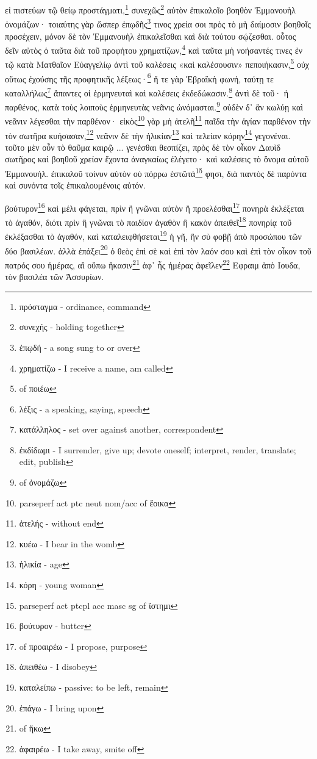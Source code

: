 εἰ
πιστεύων
τῷ
θείῳ
προστάγματι,\footnote{πρόσταγμα - ordinance, command}
συνεχῶς\footnote{συνεχής - holding together}
αὐτὸν
ἐπικαλοῖο
βοηθὸν
Ἐμμανουὴλ
ὀνομάζων·
τοιαύτης
γὰρ
ὥσπερ
ἐπῳδῆς\footnote{ἐπῳδή - a song sung to or over}
τινος
χρεία
σοι
πρὸς
τὸ
μὴ
δαίμοσιν
βοηθοῖς
προσέχειν,
μόνον
δὲ
τὸν
Ἐμμανουὴλ
ἐπικαλεῖσθαι
καὶ
διὰ
τούτου
σῴζεσθαι.
οὗτος
δεῖν
αὐτὸς
ὁ
ταῦτα
διὰ
τοῦ
προφήτου
χρηματίζων,\footnote{χρηματίζω - I receive a name, am called}
καὶ
ταῦτα
μὴ
νοήσαντές
τινες
ἐν
τῷ
κατὰ
Ματθαῖον
Εὐαγγελίῳ
ἀντὶ
τοῦ
καλέσεις
«καὶ
καλέσουσιν»
πεποιήκασιν,\footnote{ of ποιέω}
οὐχ
οὕτως
ἐχούσης
τῆς
προφητικῆς
λέξεως·\footnote{λέξις - a speaking, saying, speech}
ἥ
τε
γὰρ
Ἑβραϊκὴ
φωνή,
ταύτῃ
τε
καταλλήλως\footnote{κατάλληλος - set over against another, correspondent}
ἅπαντες
οἱ
ἑρμηνευταὶ
καὶ
καλέσεις
ἐκδεδώκασιν.\footnote{ἐκδίδωμι - I surrender, give up; devote oneself; interpret, render, translate; edit, publish}
ἀντὶ
δὲ
τοῦ·
ἡ
παρθένος,
κατὰ
τοὺς
λοιποὺς
ἑρμηνευτὰς
νεᾶνις
ὠνόμασται.\footnote{ of ὀνομάζω}
οὐδὲν
δ᾽
ἂν
κωλύῃ
καὶ
νεᾶνιν
λέγεσθαι
τὴν
παρθένον·
εἰκὸς\footnote{parse{perf act ptc neut nom/acc} of ἔοικα}
γὰρ
μὴ
ἀτελῆ\footnote{ἀτελής - without end}
παῖδα
τὴν
ἁγίαν
παρθένον
τὴν
τὸν
σωτῆρα
κυήσασαν,\footnote{κυέω - I bear in the womb}
νεᾶνιν
δὲ
τὴν
ἡλικίαν\footnote{ἡλικία - age}
καὶ
τελείαν
κόρην\footnote{κόρη - young woman}
γεγονέναι.
τοῦτο
μὲν
οὖν
τὸ
θαῦμα
καιρῷ
...
γενέσθαι
θεσπίζει,
πρὸς
δὲ
τὸν
οἶκον
Δαυὶδ
σωτῆρος
καὶ
βοηθοῦ
χρείαν
ἔχοντα
ἀναγκαίως
ἐλέγετο·
καὶ
καλέσεις
τὸ
ὄνομα
αὐτοῦ
Ἐμμανουήλ.
ἐπικαλοῦ
τοίνυν
αὐτὸν
οὐ
πόρρω
ἑστῶτά\footnote{parse{perf act ptcpl acc masc sg} of ἵστημι}
φησι,
διὰ
παντὸς
δὲ
παρόντα
καὶ
συνόντα
τοῖς
ἐπικαλουμένοις
αὐτόν.


βούτυρον\footnote{βούτυρον - butter}
καὶ
μέλι
φάγεται,
πρὶν
ἢ
γνῶναι
αὐτὸν
ἢ
προελέσθαι\footnote{ of προαιρέω - I propose, purpose}
πονηρὰ
ἐκλέξεται
τὸ
ἀγαθόν,
διότι
πρὶν
ἢ
γνῶναι
τὸ
παιδίον
ἀγαθὸν
ἢ
κακὸν
ἀπειθεῖ\footnote{ἀπειθέω - I disobey}
πονηρίᾳ
τοῦ
ἐκλέξασθαι
τὸ
ἀγαθόν,
καὶ
καταλειφθήσεται\footnote{καταλείπω - passive: to be left, remain}
ἡ
γῆ,
ἣν
σὺ
φοβῇ
ἀπὸ
προσώπου
τῶν
δύο
βασιλέων.
ἀλλὰ
ἐπάξει\footnote{ἐπάγω - I bring upon}
ὁ
θεὸς
ἐπὶ
σὲ
καὶ
ἐπὶ
τὸν
λαόν
σου
καὶ
ἐπὶ
τὸν
οἶκον
τοῦ
πατρός
σου
ἡμέρας,
αἳ
οὔπω
ἥκασιν\footnote{ of ἥκω}
ἀφ᾽
ἧς
ἡμέρας
ἀφεῖλεν\footnote{ἀφαιρέω - I take away, smite off}
Εφραιμ
ἀπὸ
Ιουδα,
τὸν
βασιλέα
τῶν
Ἀσσυρίων. 

